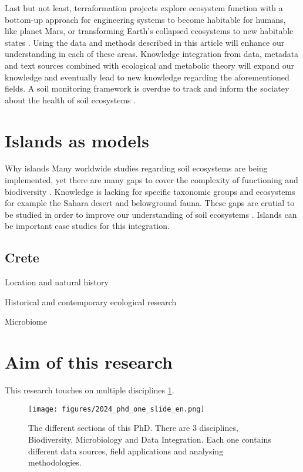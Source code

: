 Last but not least, terraformation
projects explore ecosystem function with a bottom-up approach for engineering
systems to become habitable for humans, like planet Mars, or transforming
Earth's collapsed ecosystems to new habitable states
\parencite{conde-pueyo2020Synthetic}. Using the data and methods described in this
article will enhance our understanding in each of these areas. Knowledge
integration from data, metadata and text sources combined with ecological and
metabolic theory will expand our knowledge and eventually lead to new
knowledge regarding the aforementioned fields. A soil monitoring framework 
is overdue to track and inform the sociatey about the health of 
soil ecosystems \parencite{guerra2021tracking}.

\section{Islands as models}
\label{sec:island-model}

Why islands
Many worldwide studies regarding soil ecosystems are being implemented, yet
there are many gaps to cover the complexity of functioning and biodiversity
\parencite{guerra2020Blind}. Knowledge is lacking for specific taxonomic groups and
ecosystems for example the Sahara desert and belowground fauna.
These gaps are crutial to be studied in order to
improve our understanding of soil ecosystems \parencite{cameron2018Global}. 
Islands can be important case studies for this integration.

\subsection{Crete}

Location and natural history

Historical and contemporary ecological research

Microbiome

\section{Aim of this research}
\label{sec:aim}

This research touches on multiple disciplines \ref{fig:phd-one-slide}. 

   \begin{figure}[h]
      \centering
      \texttt{[image: figures/2024\_phd\_one\_slide\_en.png]}
      \caption[Graphical abstract of this PhD]{The different sections of this PhD. There are 3 disciplines, Biodiversity, Microbiology and Data Integration. Each one contains different data sources, field applications and analysing methodologies.}
      \label{fig:phd-one-slide}
   \end{figure}


